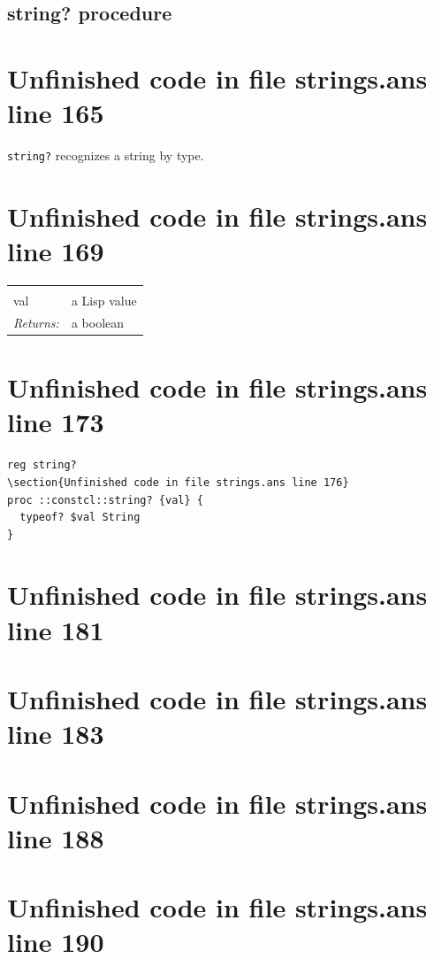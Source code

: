 \documentclass[twoside,9pt]{report}
\begin{document}
\subsection{string? procedure}
\label{string?-procedure}
\section{Unfinished code in file strings.ans line 165}


\texttt{string?} recognizes a string by type.

\section{Unfinished code in file strings.ans line 169}
\noindent\begin{tabular}{ |p{1.9cm} p{8cm}| }
\hline
\rowcolor[HTML]{CCCCCC} \multicolumn{2}{|l|}{\bf string? (public)} \\
val & a Lisp value \\
\textit{Returns:} & a boolean \\
\hline
\end{tabular}
\section{Unfinished code in file strings.ans line 173}
\begin{lstlisting}
reg string?
\section{Unfinished code in file strings.ans line 176}
proc ::constcl::string? {val} {
  typeof? $val String
}
\end{lstlisting}
\section{Unfinished code in file strings.ans line 181}
\section{Unfinished code in file strings.ans line 183}
\section{Unfinished code in file strings.ans line 188}
\section{Unfinished code in file strings.ans line 190}
\end{document}
